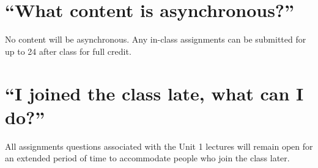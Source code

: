 \documentclass[
]{book}
\begin{document}
\hypertarget{what-content-is-asynchronous}{%
\section{``What content is asynchronous?''}\label{what-content-is-asynchronous}}

No content will be asynchronous. Any in-class assignments can be submitted for up to 24 after class for full credit.

\hypertarget{i-joined-the-class-late-what-can-i-do}{%
\section{``I joined the class late, what can I do?''}\label{i-joined-the-class-late-what-can-i-do}}

All assignments questions associated with the Unit 1 lectures will remain open for an extended period of time to accommodate people who join the class later.
\end{document}
